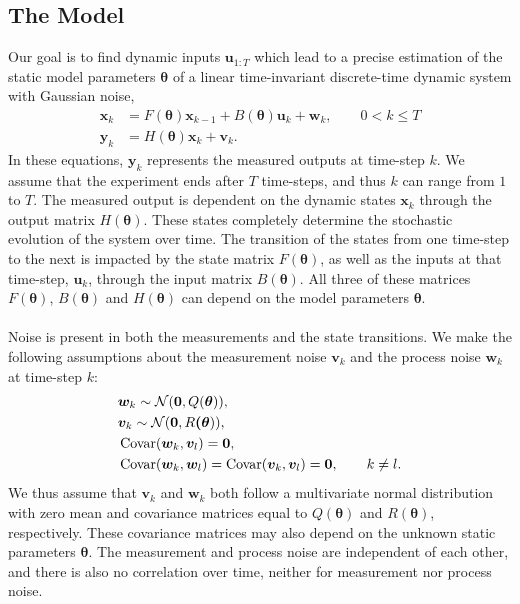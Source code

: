 \subsection{The Model}
Our goal is to find dynamic inputs $\bm  u_{1:T}$ which lead to a precise estimation of the static model parameters $\bm  \theta$ of a linear time-invariant discrete-time dynamic system with Gaussian noise,
\begin{equation}
\begin{aligned}
\bm x_{k} &= F(\bm \theta)\bm x_{k-1} + B(\bm \theta)\bm u_k + \bm w_k,
\qquad 0<k\leq T \\ 
\bm y_k &= H(\bm \theta)\bm x_k + \bm v_k.
\end{aligned}
\label{system}
\end{equation}
In these equations, $\bm  y_k$ represents the measured outputs at time-step $k$. We assume that the experiment ends after $T$ time-steps, and thus $k$ can range from $1$ to $T$. The measured output is dependent on the dynamic states $\bm  x_k$ through the output matrix $H(\bm \theta)$. These states completely determine the stochastic evolution of the system over time. The transition of the states from one time-step to the next is impacted by the state matrix $F(\bm \theta)$, as well as the inputs at that time-step, $\bm  u_k$, through the input matrix $B(\bm \theta)$. All three of these matrices $F(\bm \theta)$, $B(\bm \theta)$ and $H(\bm \theta)$  can depend on the model parameters $\bm \theta$.
\\
\\
Noise is present in both the measurements and the state transitions. We make the following assumptions about the measurement noise $\bm v_k$ and the process noise $\bm w_k$ at time-step $k$:
\begin{equation}
\begin{aligned}
& \bm w_k \sim \mathcal{N}(\bm 0,Q(\bm \theta)),\\
& \bm v_k \sim \mathcal{N}(\bm 0,R\bm (\bm \theta)),\\
&\operatorname{\mathrm{Covar}}(\bm w_k,\bm v_l) = \bm 0,\\
&\operatorname{\mathrm{Covar}}(\bm w_k,\bm w_l) = \operatorname{\mathrm{Covar}}(\bm v_k,\bm v_l) = \bm 0, \qquad k\ne l.\\
\end{aligned}
\end{equation}
We thus assume that $\bm v_k$ and $\bm w_k$ both follow a multivariate normal distribution with zero mean and covariance matrices equal to $Q(\bm \theta)$ and $R(\bm \theta)$, respectively. These covariance matrices may also depend on the unknown static parameters $\bm \theta$. The measurement and process noise are independent of each other, and there is also no correlation over time, neither for measurement nor process noise. 
